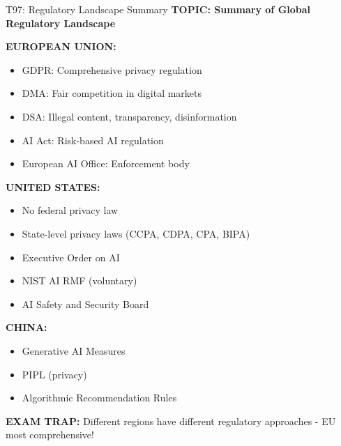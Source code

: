 \documentclass[8pt]{beamer}
\begin{document}
	\begin{frame}{T97: Regulatory Landscape Summary}
		\fontsize{6.5}{7.5}\selectfont
		\textbf{TOPIC: Summary of Global Regulatory Landscape}
		
		\vspace{0.1cm}
		\textbf{EUROPEAN UNION:}
		\begin{itemize}
			\item GDPR: Comprehensive privacy regulation
			\item DMA: Fair competition in digital markets
			\item DSA: Illegal content, transparency, disinformation
			\item AI Act: Risk-based AI regulation
			\item European AI Office: Enforcement body
		\end{itemize}
		
		\vspace{0.1cm}
		\textbf{UNITED STATES:}
		\begin{itemize}
			\item No federal privacy law
			\item State-level privacy laws (CCPA, CDPA, CPA, BIPA)
			\item Executive Order on AI
			\item NIST AI RMF (voluntary)
			\item AI Safety and Security Board
		\end{itemize}
		
		\vspace{0.1cm}
		\textbf{CHINA:}
		\begin{itemize}
			\item Generative AI Measures
			\item PIPL (privacy)
			\item Algorithmic Recommendation Rules
		\end{itemize}
		
		\textcolor{myred}{\textbf{EXAM TRAP:}} Different regions have \textcolor{myblue}{different regulatory approaches} - EU most comprehensive!
	\end{frame}
	
\end{document}
